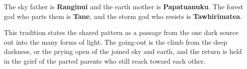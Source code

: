 The sky father is \textbf{Ranginui} and the earth mother is \textbf{Papatuanuku}. The forest god who parts them is \textbf{Tane}, and the storm god who resists is \textbf{Tawhirimatea}.

This tradition states the shared pattern as a passage from the one dark source out into the many forms of light. The going-out is the climb from the deep darkness, or the prying open of the joined sky and earth, and the return is held in the grief of the parted parents who still reach toward each other.
